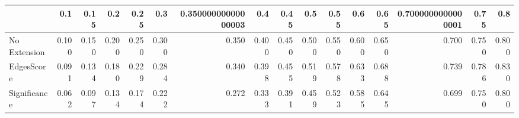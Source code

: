 \begin{tabular}{lrrrrrrrrrrrrrrr}
\toprule
{} &   0.1 &  0.15 &   0.2 &  0.25 &   0.3 & 0.35000000000000003 &   0.4 &  0.45 &   0.5 &  0.55 &   0.6 &  0.65 & 0.7000000000000001 &  0.75 &   0.8 \\
\midrule
No Extension & 0.100 & 0.150 & 0.200 & 0.250 & 0.300 &               0.350 & 0.400 & 0.450 & 0.500 & 0.550 & 0.600 & 0.650 &              0.700 & 0.750 & 0.800 \\
EdgesScore   & 0.091 & 0.134 & 0.180 & 0.229 & 0.284 &               0.340 & 0.398 & 0.455 & 0.519 & 0.578 & 0.633 & 0.688 &              0.739 & 0.786 & 0.830 \\
Significance & 0.062 & 0.097 & 0.134 & 0.174 & 0.222 &               0.272 & 0.333 & 0.391 & 0.459 & 0.523 & 0.585 & 0.645 &              0.699 & 0.750 & 0.800 \\
\bottomrule
\end{tabular}
